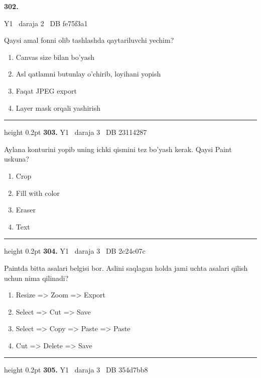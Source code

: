 \documentclass[10pt,a4paper,oneside]{article}
\begin{document}
\hypertarget{q302}{\textbf{\color{ink}302.}}  {\color{muted}\scriptsize Y1 \textbullet\ daraja 2 \textbullet\ DB fe75f3a1}
\par
Qaysi amal fonni olib tashlashda qaytariluvchi yechim?
\begin{enumerate}[label=\Alph*),leftmargin=9mm]
\item Canvas size bilan bo'yash
\item Asl qatlamni butunlay o'chirib, loyihani yopish
\item Faqat JPEG export
\item Layer mask orqali yashirish
\end{enumerate}
\vspace{2mm}\hrule height 0.2pt \vspace{4mm}
\hypertarget{q303}{\textbf{\color{ink}303.}}  {\color{muted}\scriptsize Y1 \textbullet\ daraja 3 \textbullet\ DB 23114287}
\par
Aylana konturini yopib uning ichki qismini tez bo'yash kerak. Qaysi Paint uskuna?
\begin{enumerate}[label=\Alph*),leftmargin=9mm]
\item Crop
\item Fill with color
\item Eraser
\item Text
\end{enumerate}
\vspace{2mm}\hrule height 0.2pt \vspace{4mm}
\hypertarget{q304}{\textbf{\color{ink}304.}}  {\color{muted}\scriptsize Y1 \textbullet\ daraja 3 \textbullet\ DB 2c24c07c}
\par
Paintda bitta asalari belgisi bor. Aslini saqlagan holda jami uchta asalari qilish uchun nima qilinadi?
\begin{enumerate}[label=\Alph*),leftmargin=9mm]
\item Resize =\textgreater{} Zoom =\textgreater{} Export
\item Select =\textgreater{} Cut =\textgreater{} Save
\item Select =\textgreater{} Copy =\textgreater{} Paste =\textgreater{} Paste
\item Cut =\textgreater{} Delete =\textgreater{} Save
\end{enumerate}
\vspace{2mm}\hrule height 0.2pt \vspace{4mm}
\hypertarget{q305}{\textbf{\color{ink}305.}}  {\color{muted}\scriptsize Y1 \textbullet\ daraja 3 \textbullet\ DB 354d7bb8}
\end{document}

